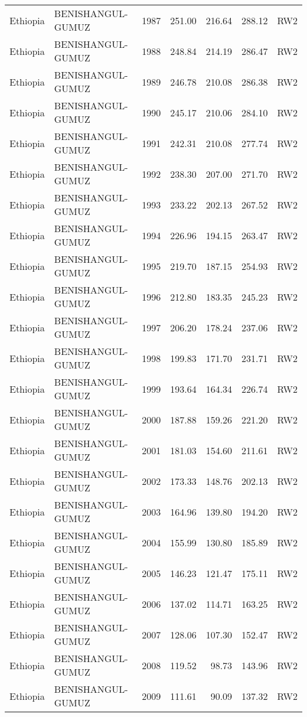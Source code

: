 \begin{longtable}{lllrrrl}
  Ethiopia & BENISHANGUL-GUMUZ & 1987 & 251.00 & 216.64 & 288.12 & RW2 \\ 
  Ethiopia & BENISHANGUL-GUMUZ & 1988 & 248.84 & 214.19 & 286.47 & RW2 \\ 
  Ethiopia & BENISHANGUL-GUMUZ & 1989 & 246.78 & 210.08 & 286.38 & RW2 \\ 
  Ethiopia & BENISHANGUL-GUMUZ & 1990 & 245.17 & 210.06 & 284.10 & RW2 \\ 
  Ethiopia & BENISHANGUL-GUMUZ & 1991 & 242.31 & 210.08 & 277.74 & RW2 \\ 
  Ethiopia & BENISHANGUL-GUMUZ & 1992 & 238.30 & 207.00 & 271.70 & RW2 \\ 
  Ethiopia & BENISHANGUL-GUMUZ & 1993 & 233.22 & 202.13 & 267.52 & RW2 \\ 
  Ethiopia & BENISHANGUL-GUMUZ & 1994 & 226.96 & 194.15 & 263.47 & RW2 \\ 
  Ethiopia & BENISHANGUL-GUMUZ & 1995 & 219.70 & 187.15 & 254.93 & RW2 \\ 
  Ethiopia & BENISHANGUL-GUMUZ & 1996 & 212.80 & 183.35 & 245.23 & RW2 \\ 
  Ethiopia & BENISHANGUL-GUMUZ & 1997 & 206.20 & 178.24 & 237.06 & RW2 \\ 
  Ethiopia & BENISHANGUL-GUMUZ & 1998 & 199.83 & 171.70 & 231.71 & RW2 \\ 
  Ethiopia & BENISHANGUL-GUMUZ & 1999 & 193.64 & 164.34 & 226.74 & RW2 \\ 
  Ethiopia & BENISHANGUL-GUMUZ & 2000 & 187.88 & 159.26 & 221.20 & RW2 \\ 
  Ethiopia & BENISHANGUL-GUMUZ & 2001 & 181.03 & 154.60 & 211.61 & RW2 \\ 
  Ethiopia & BENISHANGUL-GUMUZ & 2002 & 173.33 & 148.76 & 202.13 & RW2 \\ 
  Ethiopia & BENISHANGUL-GUMUZ & 2003 & 164.96 & 139.80 & 194.20 & RW2 \\ 
  Ethiopia & BENISHANGUL-GUMUZ & 2004 & 155.99 & 130.80 & 185.89 & RW2 \\ 
  Ethiopia & BENISHANGUL-GUMUZ & 2005 & 146.23 & 121.47 & 175.11 & RW2 \\ 
  Ethiopia & BENISHANGUL-GUMUZ & 2006 & 137.02 & 114.71 & 163.25 & RW2 \\ 
  Ethiopia & BENISHANGUL-GUMUZ & 2007 & 128.06 & 107.30 & 152.47 & RW2 \\ 
  Ethiopia & BENISHANGUL-GUMUZ & 2008 & 119.52 & 98.73 & 143.96 & RW2 \\ 
  Ethiopia & BENISHANGUL-GUMUZ & 2009 & 111.61 & 90.09 & 137.32 & RW2 \\ 

\end{longtable}
